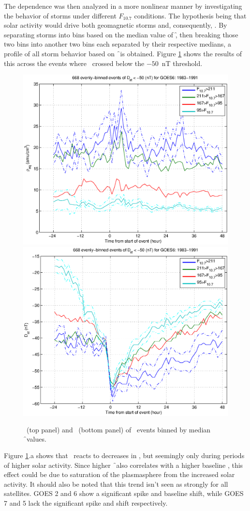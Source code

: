 The dependence was then analyzed in a more nonlinear manner by investigating the behavior of storms under different $F_{10.7}$ conditions. The hypothesis being that solar activity would drive both geomagnetic storms and, consequently, \req. By separating storms into bins based on the median value of \f, then breaking those two bins into another two bins each separated by their respective medians, a profile of all storm behavior based on \f\ is obtained. Figure \ref{fig:HighLowF107rhoeq} shows the results of this across the events where \dst\ crossed below the $-50$~nT threshold. 

\begin{figure}[htp!]
	\centering
	\includegraphics[width=0.7\linewidth]{Figures/HighLowF107rhoeq-Dst50-GOES6-1983-1991}
	\includegraphics[width=0.7\linewidth]{Figures/HighLowF107Dst-Dst50-GOES6-1983-1991}	
	\caption{\req\ (top panel) and \dst\ (bottom panel) of \dst\ events binned by median \f\ values.}
	\label{fig:HighLowF107rhoeq}
\end{figure}

Figure \ref{fig:HighLowF107rhoeq}.a shows that \req\ reacts to decreases in \dst, but seemingly only during periods of higher solar activity. Since higher \f\ also correlates with a higher baseline \req, this effect could be due to saturation of the plasmasphere from the increased solar activity. It should also be noted that this trend isn't seen as strongly for all satellites. GOES 2 and 6 show a significant spike and baseline shift, while GOES 7 and 5 lack the significant spike and shift respectively. 

